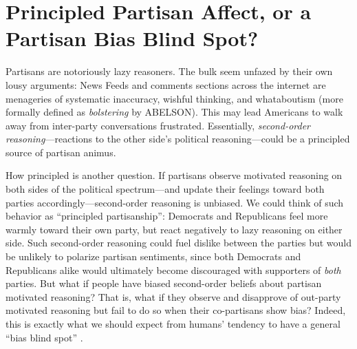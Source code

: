\documentclass[12pt, letterpaper]{article}
\begin{document}


\section*{Principled Partisan Affect, or a Partisan Bias Blind Spot?}

Partisans are notoriously lazy reasoners. The bulk seem unfazed by their own lousy arguments: News Feeds and comments sections across the internet are menageries of systematic inaccuracy, wishful thinking, and whataboutism (more formally defined as \emph{bolstering} by ABELSON). This may lead Americans to walk away from inter-party conversations frustrated. Essentially, \emph{second-order reasoning}---reactions to the other side's political reasoning---could be a principled source of partisan animus. 

How principled is another question. If partisans observe motivated reasoning on both sides of the political spectrum---and update their feelings toward both parties accordingly---second-order reasoning is unbiased. We could think of such behavior as ``principled partisanship'': Democrats and Republicans feel more warmly toward their own party, but react negatively to lazy reasoning on either side. Such second-order reasoning could fuel dislike between the parties but would be unlikely to polarize partisan sentiments, since both Democrats and Republicans alike would ultimately become discouraged with supporters of \emph{both} parties. But what if people have biased second-order beliefs about partisan motivated reasoning? That is, what if they observe and disapprove of out-party motivated reasoning but fail to do so when their co-partisans show bias? Indeed, this is exactly what we should expect from humans' tendency to have a general ``bias blind spot'' \citep{proninetal_2002,pronin_2007}.
\end{document}

